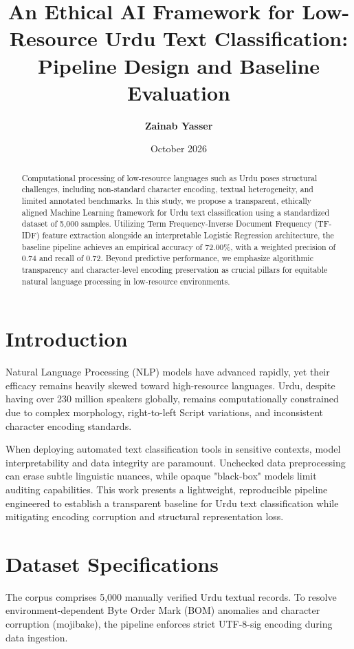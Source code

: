 \documentclass[11pt,a4paper]{article}
\title{\textbf{An Ethical AI Framework for Low-Resource Urdu Text Classification: Pipeline Design and Baseline Evaluation}}
\author{\textbf{Zainab Yasser}}
\date{October 2026}
\begin{document}
\maketitle

\begin{abstract}
Computational processing of low-resource languages such as Urdu poses structural challenges, including non-standard character encoding, textual heterogeneity, and limited annotated benchmarks. In this study, we propose a transparent, ethically aligned Machine Learning framework for Urdu text classification using a standardized dataset of 5,000 samples. Utilizing Term Frequency-Inverse Document Frequency (TF-IDF) feature extraction alongside an interpretable Logistic Regression architecture, the baseline pipeline achieves an empirical accuracy of 72.00\%, with a weighted precision of 0.74 and recall of 0.72. Beyond predictive performance, we emphasize algorithmic transparency and character-level encoding preservation as crucial pillars for equitable natural language processing in low-resource environments.
\end{abstract}

\section{Introduction}
Natural Language Processing (NLP) models have advanced rapidly, yet their efficacy remains heavily skewed toward high-resource languages. Urdu, despite having over 230 million speakers globally, remains computationally constrained due to complex morphology, right-to-left Script variations, and inconsistent character encoding standards. 

When deploying automated text classification tools in sensitive contexts, model interpretability and data integrity are paramount. Unchecked data preprocessing can erase subtle linguistic nuances, while opaque "black-box" models limit auditing capabilities. This work presents a lightweight, reproducible pipeline engineered to establish a transparent baseline for Urdu text classification while mitigating encoding corruption and structural representation loss.

\section{Dataset Specifications}
The corpus comprises 5,000 manually verified Urdu textual records. To resolve environment-dependent Byte Order Mark (BOM) anomalies and character corruption (mojibake), the pipeline enforces strict UTF-8-sig encoding during data ingestion.
\end{document}
